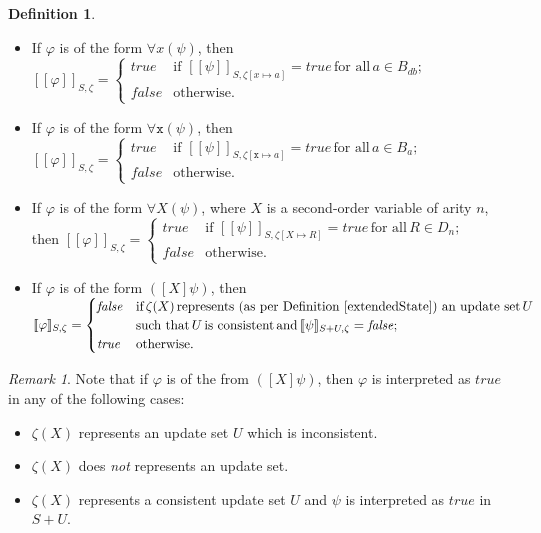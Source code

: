 \documentclass[preprint,11pt]{elsarticle}
\theoremstyle{definition}
\newtheorem{definition}{Definition}[section]
\theoremstyle{remark}
\newtheorem{remark}{Remark}
\begin{document}
\begin{definition}
\begin{itemize}
\item If $\varphi$ is of the form $\forall x (\psi)$, then $[\![\varphi]\!]_{S,\zeta} = \begin{cases} \mathit{true} &\text{if } [\![\psi]\!]_{S,\zeta[x\mapsto a]}=\mathit{true} \, \text{for all} \, a\in B_{db};\\ \textit{false} & \text{otherwise.}\end{cases}$  
\item If $\varphi$ is of the form $\forall \mathtt{x} (\psi)$, then $[\![\varphi]\!]_{S,\zeta} = \begin{cases} \mathit{true} &\text{if } [\![\psi]\!]_{S,\zeta[\mathtt{x}\mapsto a]}=\mathit{true} \, \text{for all} \, a\in B_{a};\\ \textit{false} & \text{otherwise.}\end{cases}$  
\item If $\varphi$ is of the form $\forall X (\psi)$, where $X$ is a second-order variable of arity $n$, then  $[\![\varphi]\!]_{S,\zeta} = \begin{cases} \mathit{true} &\text{if } [\![\psi]\!]_{S,\zeta[X \mapsto R]}=\mathit{true} \, \text{for all} \, R \in D_n;\\ \textit{false} & \text{otherwise.}\end{cases}$  
\item If $\varphi$ is of the form $([X]\psi)$, then \\ \hspace*{0.7cm}$[\![\varphi]\!]_{S,\zeta} = \begin{cases} \mathit{false} & \text{if} \, \zeta(X) \, \text{represents (as per Definition~\ref{extendedState}) an update set} \, U
\\ & \text{such that} \, U \, \text{is consistent} \, \text{and} \, [\![\psi]\!]_{S+U,\zeta}=\mathit{false};\\ \textit{true} & \text{otherwise.}\end{cases}$  
\end{itemize}
\end{definition}

\begin{remark}
Note that if $\varphi$ is of the from $([X]\psi)$, then $\varphi$ is interpreted as $\textit{true}$ in any of the following cases: 
\begin{itemize}
\item $\zeta(X)$ represents an update set $U$ which is inconsistent. 
\item $\zeta(X)$ does \emph{not} represents an update set.
\item $\zeta(X)$ represents a consistent update set $U$ and $\psi$ is interpreted as $\mathit{true}$ in $S+U$. 
\end{itemize}
\end{remark}
\end{document}

